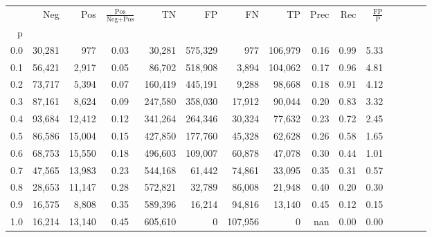 \begin{tabular}{rrrcrrrrrrrrrrr}
\toprule
{} &     Neg &     Pos & $\frac{\text{Pos}}{\text{Neg}+\text{Pos}}$ &       TN &       FP &       FN &       TP &  Prec &   Rec & $\frac{\text{FP}}{\text{P}}$ \\
p   &         &         &                                            &          &          &          &          &       &       &                              \\
\midrule
0.0 &  30,281 &     977 &                                       0.03 &   30,281 &  575,329 &      977 &  106,979 &  0.16 &  0.99 &                         5.33 \\
0.1 &  56,421 &   2,917 &                                       0.05 &   86,702 &  518,908 &    3,894 &  104,062 &  0.17 &  0.96 &                         4.81 \\
0.2 &  73,717 &   5,394 &                                       0.07 &  160,419 &  445,191 &    9,288 &   98,668 &  0.18 &  0.91 &                         4.12 \\
0.3 &  87,161 &   8,624 &                                       0.09 &  247,580 &  358,030 &   17,912 &   90,044 &  0.20 &  0.83 &                         3.32 \\
0.4 &  93,684 &  12,412 &                                       0.12 &  341,264 &  264,346 &   30,324 &   77,632 &  0.23 &  0.72 &                         2.45 \\
0.5 &  86,586 &  15,004 &                                       0.15 &  427,850 &  177,760 &   45,328 &   62,628 &  0.26 &  0.58 &                         1.65 \\
0.6 &  68,753 &  15,550 &                                       0.18 &  496,603 &  109,007 &   60,878 &   47,078 &  0.30 &  0.44 &                         1.01 \\
0.7 &  47,565 &  13,983 &                                       0.23 &  544,168 &   61,442 &   74,861 &   33,095 &  0.35 &  0.31 &                         0.57 \\
0.8 &  28,653 &  11,147 &                                       0.28 &  572,821 &   32,789 &   86,008 &   21,948 &  0.40 &  0.20 &                         0.30 \\
0.9 &  16,575 &   8,808 &                                       0.35 &  589,396 &   16,214 &   94,816 &   13,140 &  0.45 &  0.12 &                         0.15 \\
1.0 &  16,214 &  13,140 &                                       0.45 &  605,610 &        0 &  107,956 &        0 &   nan &  0.00 &                         0.00 \\
\bottomrule
\end{tabular}

